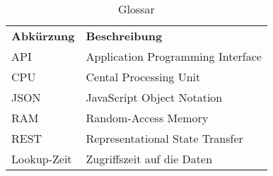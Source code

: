 \begin{table}[h]
	\centering
	\begin{tabularx}{\textwidth}{X X}
		\rowcolor[HTML]{C0C0C0}
		\textbf{Abkürzung} & \textbf{Beschreibung} \\
		API & Application Programming Interface \\
		\rowcolor[HTML]{E7E7E7}
		CPU & Cental Processing Unit \\
		JSON & JavaScript Object Notation \\
		\rowcolor[HTML]{E7E7E7}
		RAM & Random-Access Memory \\
		REST & Representational State Transfer \\
		\rowcolor[HTML]{E7E7E7}
		Lookup-Zeit & Zugriffszeit auf die Daten \\
	\end{tabularx}
	\caption{Glossar}
	\label{table:glossar}
\end{table}
